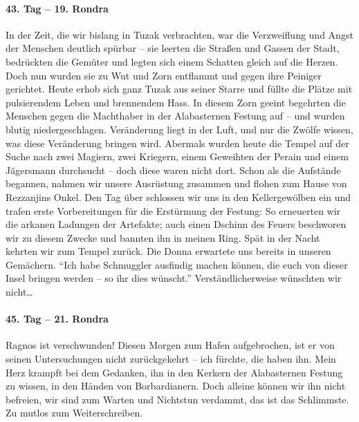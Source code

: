 \paragraph{43. Tag -- 19. Rondra}
In der Zeit, die wir bislang in Tuzak verbrachten, war die Verzweiflung und Angst der Menschen deutlich spürbar -- sie leerten die Straßen und Gassen der Stadt, bedrückten die Gemüter und legten sich einem Schatten gleich auf die Herzen. Doch nun wurden sie zu Wut und Zorn entflammt und gegen ihre Peiniger gerichtet. Heute erhob sich ganz Tuzak aus seiner Starre und füllte die Plätze mit pulsierendem Leben und brennendem Hass. In diesem Zorn geeint begehrten die Menschen gegen die Machthaber in der Alabasternen Festung auf -- und wurden blutig niedergeschlagen. Veränderung liegt in der Luft, und nur die Zwölfe wissen, was diese Veränderung bringen wird. Abermals wurden heute die Tempel auf der Suche nach zwei Magiern, zwei Kriegern, einem Geweihten der Perain und einem Jägersmann durchsucht -- doch diese waren nicht dort. Schon als die Aufstände begannen, nahmen wir unsere Ausrüstung zusammen und flohen zum Hause von Rezzanjins Onkel. Den Tag über schlossen wir uns in den Kellergewölben ein und trafen erste Vorbereitungen für die Erstürmung der Festung: So erneuerten wir die arkanen Ladungen der Artefakte; auch einen Dschinn des Feuers beschworen wir zu diesem Zwecke und bannten ihn in meinen Ring. Spät in der Nacht kehrten wir zum Tempel zurück. Die Donna erwartete uns bereits in unseren Gemächern. ``Ich habe Schmuggler ausfindig machen können, die euch von dieser Insel bringen werden -- so ihr dies wünscht.'' Verständlicherweise wünschten wir nicht…

\paragraph{45. Tag -- 21. Rondra}

Ragnos ist verschwunden! Diesen Morgen zum Hafen aufgebrochen, ist er von seinen Untersuchungen nicht zurückgekehrt -- ich fürchte, die haben ihn. Mein Herz krampft bei dem Gedanken, ihn in den Kerkern der Alabasternen Festung zu wissen, in den Händen von Borbardianern. Doch alleine können wir ihn nicht befreien, wir sind zum Warten und Nichtstun verdammt, das ist das Schlimmste. Zu mutlos zum Weiterschreiben.

